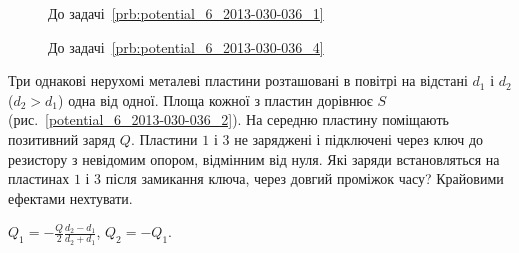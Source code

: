 \begin{figure}[h!]\centering
\begin{minipage}[t]{0.45\linewidth}\centering
\caption{До задачі~\ref{prb:potential_6_2013-030-036_1}}
\label{potential_6_2013-030-036_1}
\end{minipage}
\begin{minipage}[t]{0.45\linewidth}\centering
\caption{До задачі~\ref{prb:potential_6_2013-030-036_4}}
\label{potential_6_2013-030-036_4}
\end{minipage}
\end{figure}


\begin{problem}\label{prb:potential_6_2013-030-036_2}
    Три однакові нерухомі металеві пластини розташовані в повітрі на відстані $d_1$ і $d_2$ ($d_2> d_1$) одна від одної. Площа кожної з пластин дорівнює $S$ (рис.~\ref{potential_6_2013-030-036_2}). На середню пластину поміщають позитивний заряд $Q$. Пластини $1$ і $3$ не заряджені і підключені через ключ до резистору з невідомим опором, відмінним від нуля. Які заряди встановляться на пластинах $1$ і $3$ після замикання ключа, через довгий проміжок часу? Крайовими ефектами нехтувати.
\begin{solution}
	$Q_1 = -\frac{Q}{2}\frac{d_2 - d_1}{d_2 + d_1}$, $Q_2 = - Q_1$.
\end{solution}
\end{problem}

